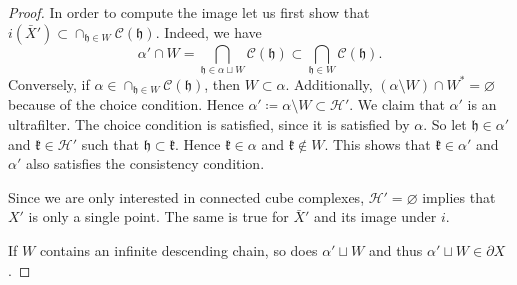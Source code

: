 \begin{proof}
  In order to compute the image let us first show that \(i(\bar X') \subset \cap_{\mathfrak{h} \in W} \mathcal{C}(\mathfrak{h})\). Indeed, we have
  \[
    \alpha' \cap W = \bigcap_{\mathfrak{h} \in \alpha \sqcup W}\mathcal{C}(\mathfrak{h}) \subset \bigcap_{\mathfrak{h} \in W} \mathcal{C}(\mathfrak{h}).
  \]
  Conversely, if \(\alpha \in \cap_{\mathfrak{h} \in W}\mathcal{C}(\mathfrak{h})\), then \(W \subset \alpha\). Additionally, \((\alpha \setminus W) \cap W^\ast = \varnothing\) because of the choice condition. Hence \(\alpha' \coloneqq \alpha \setminus W \subset \mathcal{H}'\). We claim that \(\alpha'\) is an ultrafilter. The choice condition is satisfied, since it is satisfied by \(\alpha\). So let \(\mathfrak{h} \in \alpha'\) and \(\mathfrak{k} \in \mathcal{H}'\) such that \(\mathfrak{h} \subset \mathfrak{k}\). Hence \(\mathfrak{k} \in \alpha\) and \(\mathfrak{k} \notin W\). This shows that \(\mathfrak{k} \in \alpha'\) and \(\alpha'\) also satisfies the consistency condition.

  Since we are only interested in connected cube complexes, \(\mathcal{H}' = \varnothing\) implies that \(X'\) is only a single point. The same is true for \(\bar X'\) and its image under \(i\).

  If \(W\) contains an infinite descending chain, so does \(\alpha' \sqcup W\) and thus \(\alpha' \sqcup W \in \partial X\).
\end{proof}

